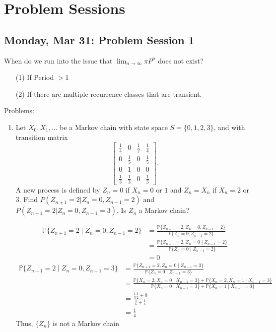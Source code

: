 \documentclass[10pt, oneside]{article}
\newcommand{\bbP}{\mathbb{P}}
\theoremstyle{definition}
\begin{document}
\section{Problem Sessions}
\subsection{Monday, Mar 31: Problem Session 1}
When do we run into the issue that $\lim_{n\to \infty}\pi P^n$ does not exist? 
\begin{enumerate}
    \item[(1)] If Period $> 1$
    \item[(2)] If there are multiple recurrence classes that are transient.
\end{enumerate}

Problems:
\begin{enumerate}
    \item Let $X_0, X_1, \dots$ be a Markov chain with state space $S = \{0, 1, 2, 3\}$, and with transition matrix
    \[
    \begin{bmatrix}
        \frac{1}{4} & 0 & \frac{1}{2} & \frac{1}{4} \\
        0 &  \frac{1}{5} & 0 & \frac{1}{5} \\
        0 & 1 & 0 & 0 \\
        \frac{1}{3} & \frac{1}{3} & 0 & \frac{1}{3}
    \end{bmatrix}.
    \]
    A new process is defined by $Z_n = 0$ if $X_n = 0$ or $1$ and $Z_n = X_n$ if $X_n = 2$ or $3$. Find $P(Z_{n+1} = 2 | Z_n = 0, Z_{n-1} = 2)$ and $P(Z_{n+1} = 2 | Z_n = 0, Z_{n-1} = 3)$. Is $Z_n$ a Markov chain?
    \begin{solution}
    \begin{align*}
        \bbP\{Z_{n + 1}= 2 \mid Z_n = 0, Z_{n-1} = 2\} &= \frac{\bbP\{Z_{n + 1} = 2, Z_{n} = 0, Z_{n-1} = 2\}}{\bbP\{Z_n = 0, Z_{n-1 } = 2\}}\\
        &= \frac{\bbP\{Z_{n + 1} = 2, Z_{n} = 0 \mid Z_{n-1} =2\}}{\bbP\{Z_n = 0 \mid Z_{n-1} = 2\}}\\
        &= 0
    \end{align*}
    \begin{align*}
        \bbP\{Z_{n + 1} = 2 \mid Z_n = 0, Z_{n-1} = 3\} &= \frac{\bbP\{Z_{n + 1} = 2, Z_{n} = 0 \mid Z_{n-1} =3\}}{\bbP\{Z_n = 0 \mid Z_{n-1} = 3\}}\\
        &= \frac{\bbP\{X_n = 2, X_n = 0 \mid X_{n-1} = 3\} +\bbP\{X_n = 2, X_n = 1 \mid X_{n-1} = 3\}}{\bbP\{X_n = 0 \mid X_{n-1} =3\} + \bbP\{X_{n} = 1 \mid X_{n-1} = 3\}}\\
        &= \frac{\frac{1}{3}\frac{1}{2} + 0}{\frac{1}{6} + \frac{1}{6}}\\
        &= \frac{1}{4}
    \end{align*}
    Thus, $\{Z_n\}$ is not a Markov chain
    \end{solution}


\end{enumerate}
\end{document}
